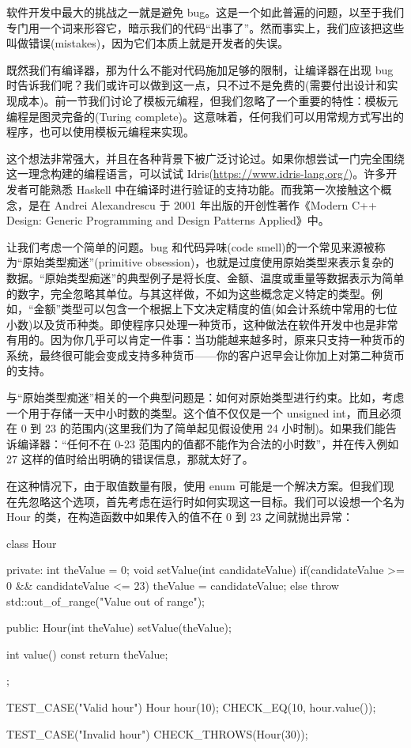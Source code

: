 

软件开发中最大的挑战之一就是避免 bug。这是一个如此普遍的问题，以至于我们专门用一个词来形容它，暗示我们的代码“出事了”。然而事实上，我们应该把这些叫做错误(mistakes)，因为它们本质上就是开发者的失误。

既然我们有编译器，那为什么不能对代码施加足够的限制，让编译器在出现 bug 时告诉我们呢？我们或许可以做到这一点，只不过不是免费的(需要付出设计和实现成本)。前一节我们讨论了模板元编程，但我们忽略了一个重要的特性：模板元编程是图灵完备的(Turing complete)。这意味着，任何我们可以用常规方式写出的程序，也可以使用模板元编程来实现。

这个想法非常强大，并且在各种背景下被广泛讨论过。如果你想尝试一门完全围绕这一理念构建的编程语言，可以试试 Idris(\url{https://www.idris-lang.org/})。许多开发者可能熟悉 Haskell 中在编译时进行验证的支持功能。而我第一次接触这个概念，是在 Andrei Alexandrescu 于 2001 年出版的开创性著作《Modern C++ Design: Generic Programming and Design Patterns Applied》中。

让我们考虑一个简单的问题。bug 和代码异味(code smell)的一个常见来源被称为“原始类型痴迷”(primitive obsession)，也就是过度使用原始类型来表示复杂的数据。“原始类型痴迷”的典型例子是将长度、金额、温度或重量等数据表示为简单的数字，完全忽略其单位。与其这样做，不如为这些概念定义特定的类型。例如，“金额”类型可以包含一个根据上下文决定精度的值(如会计系统中常用的七位小数)以及货币种类。即使程序只处理一种货币，这种做法在软件开发中也是非常有用的。因为你几乎可以肯定一件事：当功能越来越多时，原来只支持一种货币的系统，最终很可能会变成支持多种货币——你的客户迟早会让你加上对第二种货币的支持。

与“原始类型痴迷”相关的一个典型问题是：如何对原始类型进行约束。比如，考虑一个用于存储一天中小时数的类型。这个值不仅仅是一个 unsigned int，而且必须在 0 到 23 的范围内(这里我们为了简单起见假设使用 24 小时制)。如果我们能告诉编译器：“任何不在 0-23 范围内的值都不能作为合法的小时数”，并在传入例如 27 这样的值时给出明确的错误信息，那就太好了。

在这种情况下，由于取值数量有限，使用 enum 可能是一个解决方案。但我们现在先忽略这个选项，首先考虑在运行时如何实现这一目标。我们可以设想一个名为 Hour 的类，在构造函数中如果传入的值不在 0 到 23 之间就抛出异常：

\begin{cpp}
class Hour{
private:
  int theValue = 0;
  void setValue(int candidateValue) {
    if(candidateValue >= 0 && candidateValue <= 23){
      theValue = candidateValue;
    }
    else{
      throw std::out_of_range("Value out of range");
    } 
  }

public:
  Hour(int theValue){
    setValue(theValue);
  }

  int value() const {
    return theValue;
  }
};

TEST_CASE("Valid hour"){
  Hour hour(10);
  CHECK_EQ(10, hour.value());
}

TEST_CASE("Invalid hour"){
  CHECK_THROWS(Hour(30));
}
\end{cpp}

